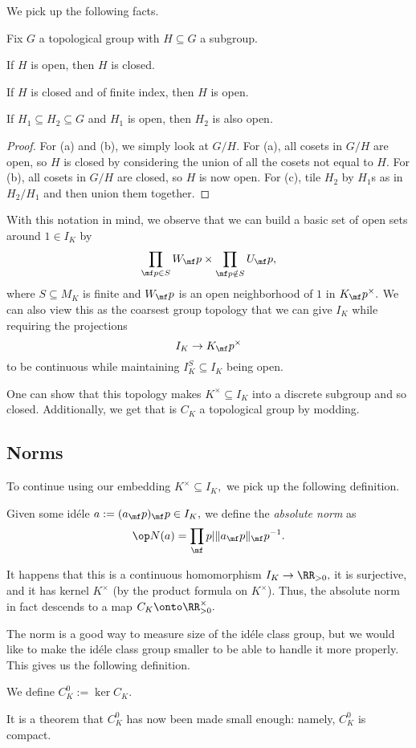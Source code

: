 \documentclass[../notes.tex]{subfiles}
\begin{document}
We pick up the following facts.
\begin{proposition}
	Fix $G$ a topological group with $H\subseteq G$ a subgroup.
	\begin{listalph}
		\item If $H$ is open, then $H$ is closed.
		\item If $H$ is closed and of finite index, then $H$ is open.
		\item If $H_1\subseteq H_2\subseteq G$ and $H_1$ is open, then $H_2$ is also open.
	\end{listalph}
\end{proposition}
\begin{proof}
	For (a) and (b), we simply look at $G/H.$ For (a), all cosets in $G/H$ are open, so $H$ is closed by considering the union of all the cosets not equal to $H.$ For (b), all cosets in $G/H$ are closed, so $H$ is now open. For (c), tile $H_2$ by $H_1$s as in $H_2/H_1$ and then union them together.
\end{proof}
With this notation in mind, we observe that we can build a basic set of open sets around $1\in I_K$ by
\[\prod_{\mf p\in S}W_\mf p\times\prod_{\mf p\notin S}U_\mf p,\]
where $S\subseteq M_K$ is finite and $W_\mf p$ is an open neighborhood of $1$ in $K_\mf p^\times.$ We can also view this as the coarsest group topology that we can give $I_K$ while requiring the projections
\[I_K\to K_\mf p^\times\]
to be continuous while maintaining $I_K^S\subseteq I_K$ being open.

One can show that this topology makes $K^\times\subseteq I_K$ into a discrete subgroup and so closed. Additionally, we get that is $C_K$ a topological group by modding.

\subsection{Norms}
To continue using our embedding $K^\times\subseteq I_K,$ we pick up the following definition.
\begin{definition}
	Given some id\'ele $a:=(a_\mf p)_\mf p\in I_K,$ we define the \textit{absolute norm} as
	\[\op N(a)=\prod_\mf p\lvert\lVert a_\mf p\rVert_\mf p^{-1}.\]
\end{definition}
It happens that this is a continuous homomorphism $I_K\to\RR_{>0},$ it is surjective, and it has kernel $K^\times$ (by the product formula on $K^\times$). Thus, the absolute norm in fact descends to a map $C_K\onto\RR^\times_{>0}.$

The norm is a good way to measure size of the id\'ele class group, but we would like to make the id\'ele class group smaller to be able to handle it more properly. This gives us the following definition.
\begin{definition}[\texorpdfstring{$C_K^0$}{}]
	We define $C_K^0:=\ker C_K.$
\end{definition}
It is a theorem that $C_K^0$ has now been made small enough: namely, $C_K^0$ is compact.
\end{document}
